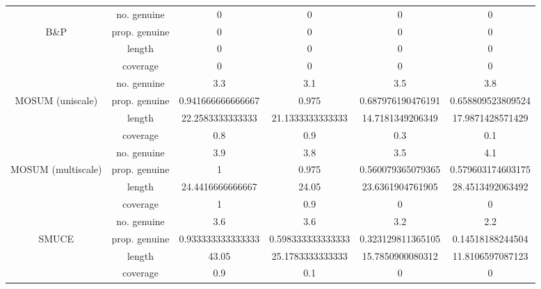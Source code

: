 \begin{tabular}{|c|c|c|c|c|c|}
   & no. genuine & 0 & 0 & 0 & 0 \\ 
  B\&P & prop. genuine & 0 & 0 & 0 & 0 \\ 
   & length & 0 & 0 & 0 & 0 \\ 
   & coverage & 0 & 0 & 0 & 0 \\ 
   & no. genuine & 3.3 & 3.1 & 3.5 & 3.8 \\ 
  MOSUM (uniscale) & prop. genuine & 0.941666666666667 & 0.975 & 0.687976190476191 & 0.658809523809524 \\ 
   & length & 22.2583333333333 & 21.1333333333333 & 14.7181349206349 & 17.9871428571429 \\ 
   & coverage & 0.8 & 0.9 & 0.3 & 0.1 \\ 
   & no. genuine & 3.9 & 3.8 & 3.5 & 4.1 \\ 
  MOSUM (multiscale) & prop. genuine & 1 & 0.975 & 0.560079365079365 & 0.579603174603175 \\ 
   & length & 24.4416666666667 & 24.05 & 23.6361904761905 & 28.4513492063492 \\ 
   & coverage & 1 & 0.9 & 0 & 0 \\ 
   & no. genuine & 3.6 & 3.6 & 3.2 & 2.2 \\ 
  SMUCE & prop. genuine & 0.933333333333333 & 0.598333333333333 & 0.323129811365105 & 0.14518188244504 \\ 
   & length & 43.05 & 25.1783333333333 & 15.7850900080312 & 11.8106597087123 \\ 
   & coverage & 0.9 & 0.1 & 0 & 0 \\ 
   \hline
\end{tabular}
